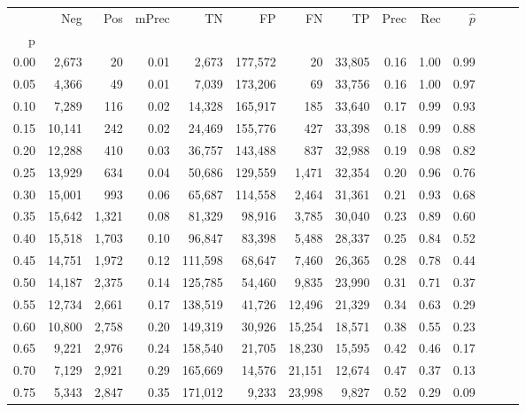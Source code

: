 \begin{tabular}{rrrrrrrrrrrrrr}
\toprule
{} &     Neg &    Pos & mPrec &       TN &       FP &      FN &      TP &  Prec &   Rec & $\hat{p}$ \\
p    &         &        &       &          &          &         &         &       &       &           \\
\midrule
0.00 &   2,673 &     20 &  0.01 &    2,673 &  177,572 &      20 &  33,805 &  0.16 &  1.00 &      0.99 \\
0.05 &   4,366 &     49 &  0.01 &    7,039 &  173,206 &      69 &  33,756 &  0.16 &  1.00 &      0.97 \\
0.10 &   7,289 &    116 &  0.02 &   14,328 &  165,917 &     185 &  33,640 &  0.17 &  0.99 &      0.93 \\
0.15 &  10,141 &    242 &  0.02 &   24,469 &  155,776 &     427 &  33,398 &  0.18 &  0.99 &      0.88 \\
0.20 &  12,288 &    410 &  0.03 &   36,757 &  143,488 &     837 &  32,988 &  0.19 &  0.98 &      0.82 \\
0.25 &  13,929 &    634 &  0.04 &   50,686 &  129,559 &   1,471 &  32,354 &  0.20 &  0.96 &      0.76 \\
0.30 &  15,001 &    993 &  0.06 &   65,687 &  114,558 &   2,464 &  31,361 &  0.21 &  0.93 &      0.68 \\
0.35 &  15,642 &  1,321 &  0.08 &   81,329 &   98,916 &   3,785 &  30,040 &  0.23 &  0.89 &      0.60 \\
0.40 &  15,518 &  1,703 &  0.10 &   96,847 &   83,398 &   5,488 &  28,337 &  0.25 &  0.84 &      0.52 \\
0.45 &  14,751 &  1,972 &  0.12 &  111,598 &   68,647 &   7,460 &  26,365 &  0.28 &  0.78 &      0.44 \\
0.50 &  14,187 &  2,375 &  0.14 &  125,785 &   54,460 &   9,835 &  23,990 &  0.31 &  0.71 &      0.37 \\
0.55 &  12,734 &  2,661 &  0.17 &  138,519 &   41,726 &  12,496 &  21,329 &  0.34 &  0.63 &      0.29 \\
0.60 &  10,800 &  2,758 &  0.20 &  149,319 &   30,926 &  15,254 &  18,571 &  0.38 &  0.55 &      0.23 \\
0.65 &   9,221 &  2,976 &  0.24 &  158,540 &   21,705 &  18,230 &  15,595 &  0.42 &  0.46 &      0.17 \\
0.70 &   7,129 &  2,921 &  0.29 &  165,669 &   14,576 &  21,151 &  12,674 &  0.47 &  0.37 &      0.13 \\
0.75 &   5,343 &  2,847 &  0.35 &  171,012 &    9,233 &  23,998 &   9,827 &  0.52 &  0.29 &      0.09 \\

\end{tabular}
